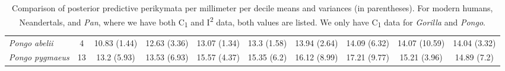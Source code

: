 \begin{table}[h]
{\begin{tabular}{lccccccccc}
    \midrule
    \textit{Pongo abelii} & 4 & 10.83 (1.44) & 12.63 (3.36) & 13.07 (1.34) & 13.3 (1.58) & 13.94 (2.64) & 14.09 (6.32) & 14.07 (10.59) & 14.04 (3.32) \\
    \textit{Pongo pygmaeus} & 13 & 13.2 (5.93) & 13.53 (6.93) & 15.57 (4.37) & 15.35 (6.2) & 16.12 (8.99) & 17.21 (9.77) & 15.21 (3.96) & 14.89 (7.2) \\
    \bottomrule
    \end{tabular}}
    \caption{Comparison of posterior predictive perikymata per millimeter per decile means and variances (in parentheses). For modern humans, Neandertals, and \textit{Pan}, where we have both C\textsubscript{1} and I\textsuperscript{2} data, both values are listed. We only have C\textsubscript{1} data for \textit{Gorilla} and \textit{Pongo}.}
    \label{table:PostPred}
\end{table}
